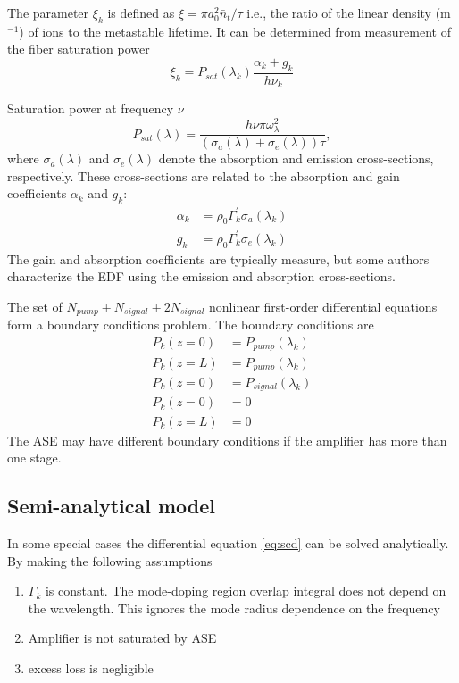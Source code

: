 \documentclass[a4paper]{article}
\begin{document}
The parameter $\xi_k$ is defined as $\xi = \pi a_0^2\bar{n}_t/\tau$ i.e., the ratio of the linear density (m$^{-1}$) of ions to the metastable lifetime. It can be determined from measurement of the fiber saturation power 
\begin{equation}
	\xi_k = P_{sat}(\lambda_k)\frac{\alpha_k+g_k}{h\nu_k}
\end{equation}

Saturation power at frequency $\nu$
\begin{equation}
P_{sat}(\lambda) = \frac{h\nu\pi\omega_{\lambda}^2}{(\sigma_a(\lambda) + \sigma_e(\lambda))\tau},
\end{equation}
where $\sigma_a(\lambda)$ and $\sigma_e(\lambda)$ denote the absorption and emission cross-sections, respectively. These cross-sections are related to the absorption and gain coefficients $\alpha_k$ and $g_k$:
\begin{align}
	\alpha_k &= \rho_0\Gamma_k^{\prime}\sigma_a(\lambda_k) \\
	g_k &= \rho_0\Gamma_k^{\prime}\sigma_e(\lambda_k)
\end{align}
The gain and absorption coefficients are typically measure, but some authors characterize the EDF using the emission and absorption cross-sections. 

The set of $N_{pump} + N_{signal} + 2N_{signal}$ nonlinear first-order differential equations form a boundary conditions problem. The boundary conditions are
\begin{align}
	P_k(z = 0) &= P_{pump}(\lambda_k) \tag{if pump propagates forward} \\
	P_k(z = L) &= P_{pump}(\lambda_k) \tag{if pump propagates backward} \\
	P_k(z = 0) &= P_{signal}(\lambda_k) \tag{Signal} \\
	P_k(z = 0) &= 0 \tag{Forward ASE} \\
	P_k(z = L) &= 0 \tag{Backward ASE}
\end{align} 
The ASE may have different boundary conditions if the amplifier has more than one stage.

\subsection{Semi-analytical model}

In some special cases the differential equation \eqref{eq:scd} can be solved analytically. By making the following assumptions
\begin{enumerate}
	\item $\Gamma_k$ is constant. The mode-doping region overlap integral does not depend on the wavelength. This ignores the mode radius dependence on the frequency
	\item Amplifier is not saturated by ASE
	\item excess loss is negligible
\end{enumerate}
\end{document}
